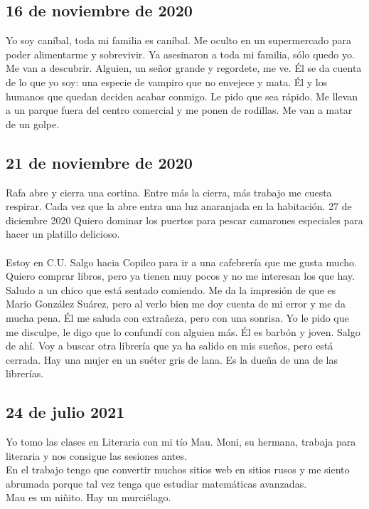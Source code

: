 \documentclass[12pt]{book}
\begin{document}
\subsection*{\hfill 16 de noviembre de 2020}
Yo soy caníbal, toda mi familia es caníbal. Me oculto en un supermercado para poder alimentarme y sobrevivir. Ya asesinaron a toda mi familia, sólo quedo yo. Me van a descubrir. Alguien, un señor grande y regordete, me ve. Él se da cuenta de lo que yo soy: una especie de vampiro que no envejece y mata. Él y los humanos que quedan deciden acabar conmigo. Le pido que sea rápido. 
Me llevan a un parque fuera del centro comercial y me ponen de rodillas. Me van a matar de un golpe.  

\subsection*{\hfill 21 de noviembre de 2020}
Rafa abre y cierra una cortina. Entre más la cierra, más trabajo me cuesta respirar. Cada vez que la abre entra una luz anaranjada en la habitación.
27 de diciembre 2020
Quiero dominar los puertos para pescar camarones especiales para hacer un platillo delicioso.
\\
\\
Estoy en C.U. Salgo hacia Copilco para ir a una cafebrería que me gusta mucho. Quiero comprar libros, pero ya tienen muy pocos y no me interesan los que hay. Saludo a un chico que está sentado comiendo. Me da la impresión de que es Mario González Suárez, pero al verlo bien me doy cuenta de mi error y me da mucha pena. Él me saluda con extrañeza, pero con una sonrisa. Yo le pido que me disculpe, le digo que lo confundí con alguien más. Él es barbón y joven.
Salgo de ahí. Voy a buscar otra librería que ya ha salido en mis sueños, pero está cerrada. Hay una mujer en un suéter gris de lana. Es la dueña de una de las librerías.
 
\subsection*{\hfill 24 de julio 2021}
Yo tomo las clases en Literaria con mi tío Mau. Moni, su hermana, trabaja para literaria y nos consigue las sesiones antes. \\
En el trabajo tengo que convertir muchos sitios web en sitios rusos y me siento abrumada porque tal vez tenga que estudiar matemáticas avanzadas.\\
Mau es un niñito. Hay un murciélago.
\end{document}
